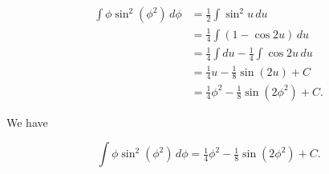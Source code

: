 \documentclass[12pt, letterpaper]{article}
\begin{document}
\begin{equation*}
\begin{aligned}
\int \phi \sin^2{\left( \phi^2 \right)} \, d\phi
  &= \tfrac{1}{2} \int \sin^2{u} \, du \\[0.2in]
  &= \tfrac{1}{4} \int \left( 1 - \cos{2u} \right) \, du \\[0.2in]
  &= \tfrac{1}{4} \int du - \tfrac{1}{4} \int \cos{2u}\, du \\[0.2in]
  &= \tfrac{1}{4} u - \tfrac{1}{8} \sin{\left( 2u \right)} + C \\[0.2in]
  &= \tfrac{1}{4} \phi^2 - \tfrac{1}{8} \sin{\left( 2\phi^2 \right)} + C.
\end{aligned}
\end{equation*}

We have

\begin{equation*}
\boxed
{
\int \phi \sin^2{\left( \phi^2 \right)} \, d\phi
  = \tfrac{1}{4} \phi^2 - \tfrac{1}{8} \sin{\left( 2\phi^2 \right)} + C.
}
\end{equation*}
\end{document}

